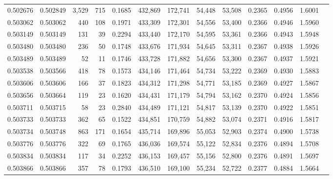 \begin{tabular}{rrrrrrrrrrrrr}
0.502676 & 0.502849 & 3,529 &   715 &                                     0.1685 & 432,869 & 172,741 &  54,448 &  53,508 & 0.2365 & 0.4956 & 1.6001 \\
0.503062 & 0.503062 &   440 &   108 &                                     0.1971 & 433,309 & 172,301 &  54,556 &  53,400 & 0.2366 & 0.4946 & 1.5960 \\
0.503149 & 0.503149 &   131 &    39 &                                     0.2294 & 433,440 & 172,170 &  54,595 &  53,361 & 0.2366 & 0.4943 & 1.5948 \\
0.503480 & 0.503480 &   236 &    50 &                                     0.1748 & 433,676 & 171,934 &  54,645 &  53,311 & 0.2367 & 0.4938 & 1.5926 \\
0.503489 & 0.503489 &    52 &    11 &                                     0.1746 & 433,728 & 171,882 &  54,656 &  53,300 & 0.2367 & 0.4937 & 1.5921 \\
0.503538 & 0.503566 &   418 &    78 &                                     0.1573 & 434,146 & 171,464 &  54,734 &  53,222 & 0.2369 & 0.4930 & 1.5883 \\
0.503606 & 0.503606 &   166 &    37 &                                     0.1823 & 434,312 & 171,298 &  54,771 &  53,185 & 0.2369 & 0.4927 & 1.5867 \\
0.503656 & 0.503664 &   119 &    23 &                                     0.1620 & 434,431 & 171,179 &  54,794 &  53,162 & 0.2370 & 0.4924 & 1.5856 \\
0.503711 & 0.503715 &    58 &    23 &                                     0.2840 & 434,489 & 171,121 &  54,817 &  53,139 & 0.2370 & 0.4922 & 1.5851 \\
0.503733 & 0.503733 &   362 &    65 &                                     0.1522 & 434,851 & 170,759 &  54,882 &  53,074 & 0.2371 & 0.4916 & 1.5817 \\
0.503734 & 0.503748 &   863 &   171 &                                     0.1654 & 435,714 & 169,896 &  55,053 &  52,903 & 0.2374 & 0.4900 & 1.5738 \\
0.503776 & 0.503776 &   322 &    69 &                                     0.1765 & 436,036 & 169,574 &  55,122 &  52,834 & 0.2376 & 0.4894 & 1.5708 \\
0.503834 & 0.503834 &   117 &    34 &                                     0.2252 & 436,153 & 169,457 &  55,156 &  52,800 & 0.2376 & 0.4891 & 1.5697 \\
0.503866 & 0.503866 &   357 &    78 &                                     0.1793 & 436,510 & 169,100 &  55,234 &  52,722 & 0.2377 & 0.4884 & 1.5664 \\

\end{tabular}
